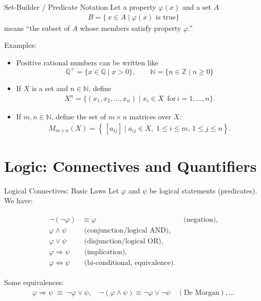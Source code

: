 \begin{frame}{Set-Builder / Predicate Notation}
Let a property $\varphi(x)$ and a set $A$
\begin{align*}
  B = \{\, x \in A \mid \varphi(x) \text{ is true} \}
\end{align*}
means “the subset of \(A\) whose members satisfy property \(\varphi\).”


\begin{block}{Examples:}
\vspace{-0.2cm}

\begin{itemize}
    \item Positive rational numbers can be written like
    $$\mathbb{Q}^{+} = \{ x \in \mathbb{Q} \mid x > 0\}, \qquad
  \mathbb{N} = \{ n \in \mathbb{Z} \mid n \ge 0 \}$$
\item If \(X\) is a set and \(n \in \mathbb{N}\), define
\begin{align*}
  X^n = \{ (x_1, x_2, \dots, x_n) \mid x_i \in X \, \, \,\text{for}\, i = 1,\dots,n\}.
\end{align*}
\item If \(m,n \in \mathbb{N}\), define the set of \(m\times n\) matrices over \(X\):
\begin{align*}
  M_{m \times n}(X) = \left\{\, [a_{ij}] \mid a_{ij} \in X,\; 1 \le i \le m,\,1 \le j \le n\right\}.
\end{align*}
\end{itemize}

\end{block}
\end{frame}

\section{Logic: Connectives and Quantifiers}

\begin{frame}{Logical Connectives: Basic Laws}
Let \(\varphi\) and \(\psi\) be logical statements (predicates). We have:
\begin{block}{}
\hspace{-2cm}
\begin{align*}
\begin{aligned}
\neg (\neg \varphi) &\equiv \varphi &\text{ (negation)}, \\
\varphi \land \psi &\text{ (conjunction/logical AND)}, \\
\varphi \lor \psi &\text{ (disjunction/logical OR)}, \\
\varphi \Rightarrow \psi &\text{ (implication)}, \\
\varphi \iff \psi &\text{ (bi-conditional, equivalence)}.
\end{aligned}
\end{align*}
\end{block}

Some equivalences:
\begin{align*}
\varphi \Rightarrow \psi \;\equiv\; \neg \varphi \lor \psi, \quad
\neg(\varphi \land \psi) \equiv \neg \varphi \lor \neg \psi \quad (\text{De Morgan}), \dots
\end{align*}
\end{frame}

